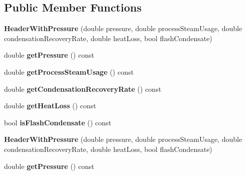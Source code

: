 \subsection*{Public Member Functions}
\begin{DoxyCompactItemize}
\item 
\mbox{\label{class_header_with_pressure_aa5e01eb051c6e4629d4e92db6165fc52}} 
{\bfseries Header\+With\+Pressure} (double pressure, double process\+Steam\+Usage, double condensation\+Recovery\+Rate, double heat\+Loss, bool flash\+Condensate)
\item 
\mbox{\label{class_header_with_pressure_a96ca85665be1791af322d3dceae12391}} 
double {\bfseries get\+Pressure} () const
\item 
\mbox{\label{class_header_with_pressure_af7a66e40970a72840c78ae39c33dd656}} 
double {\bfseries get\+Process\+Steam\+Usage} () const
\item 
\mbox{\label{class_header_with_pressure_a279f3984f0db41e8e8196666500962b4}} 
double {\bfseries get\+Condensation\+Recovery\+Rate} () const
\item 
\mbox{\label{class_header_with_pressure_a3278843587f68c6dd2039fbc9c4eabac}} 
double {\bfseries get\+Heat\+Loss} () const
\item 
\mbox{\label{class_header_with_pressure_a6ee4ff5cbe7360a8fcefd149332f2696}} 
bool {\bfseries is\+Flash\+Condensate} () const
\item 
\mbox{\label{class_header_with_pressure_aa5e01eb051c6e4629d4e92db6165fc52}} 
{\bfseries Header\+With\+Pressure} (double pressure, double process\+Steam\+Usage, double condensation\+Recovery\+Rate, double heat\+Loss, bool flash\+Condensate)
\item 
\mbox{\label{class_header_with_pressure_a96ca85665be1791af322d3dceae12391}} 
double {\bfseries get\+Pressure} () const
\item 
\mbox{\label{class_header_with_pressure_af7a66e40970a72840c78ae39c33dd656}} 

\end{DoxyCompactItemize}
